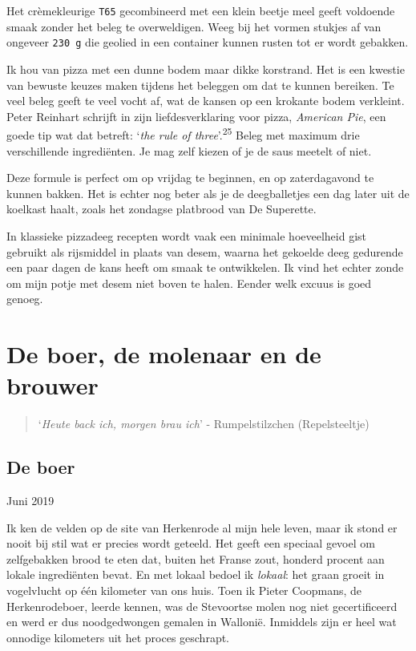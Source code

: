 \documentclass[
  11pt,
  dutch,
]{memoir}
\begin{document}
Het crèmekleurige \texttt{T65} gecombineerd met een klein beetje meel
geeft voldoende smaak zonder het beleg te overweldigen. Weeg bij het
vormen stukjes af van ongeveer \texttt{230\ g} die geolied in een
container kunnen rusten tot er wordt gebakken.

Ik hou van pizza met een dunne bodem maar dikke korstrand. Het is een
kwestie van bewuste keuzes maken tijdens het beleggen om dat te kunnen
bereiken. Te veel beleg geeft te veel vocht af, wat de kansen op een
krokante bodem verkleint. Peter Reinhart schrijft in zijn
liefdesverklaring voor pizza, \emph{American Pie}, een goede tip wat dat
betreft: `\emph{the rule of three}'.\textsuperscript{25} Beleg met
maximum drie verschillende ingrediënten. Je mag zelf kiezen of je de
saus meetelt of niet.

Deze formule is perfect om op vrijdag te beginnen, en op zaterdagavond
te kunnen bakken. Het is echter nog beter als je de deegballetjes een
dag later uit de koelkast haalt, zoals het zondagse platbrood van De
Superette.

In klassieke pizzadeeg recepten wordt vaak een minimale hoeveelheid gist
gebruikt als rijsmiddel in plaats van desem, waarna het gekoelde deeg
gedurende een paar dagen de kans heeft om smaak te ontwikkelen. Ik vind
het echter zonde om mijn potje met desem niet boven te halen. Eender
welk excuus is goed genoeg.

\hypertarget{de-boer-de-molenaar-en-de-brouwer}{%
\chapter{De boer, de molenaar en de
brouwer}\label{de-boer-de-molenaar-en-de-brouwer}}

\label{boer}

\begin{quote}
`\emph{Heute back ich, morgen brau ich}' - Rumpelstilzchen
(Repelsteeltje)
\end{quote}

\hypertarget{de-boer}{%
\section{De boer}\label{de-boer}}

\begin{flushright}
Juni 2019
\end{flushright}

Ik ken de velden op de site van Herkenrode al mijn hele leven, maar ik
stond er nooit bij stil wat er precies wordt geteeld. Het geeft een
speciaal gevoel om zelfgebakken brood te eten dat, buiten het Franse
zout, honderd procent aan lokale ingrediënten bevat. En met lokaal
bedoel ik \emph{lokaal}: het graan groeit in vogelvlucht op één
kilometer van ons huis. Toen ik Pieter Coopmans, de Herkenrodeboer,
leerde kennen, was de Stevoortse molen nog niet gecertificeerd en werd
er dus noodgedwongen gemalen in Wallonië. Inmiddels zijn er heel wat
onnodige kilometers uit het proces geschrapt.
\end{document}
